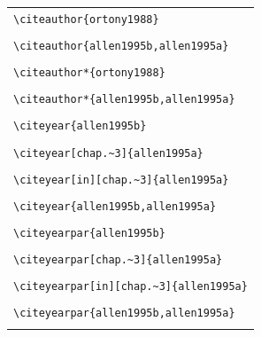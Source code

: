 ﻿\documentclass{article}
\begin{document}
\begin{center}
\begin{tabular}{l}
%
\verb#\citeauthor{ortony1988}# \\
 \citeauthor{ortony1988} \\\hline
\verb#\citeauthor{allen1995b,allen1995a}# \\
 \citeauthor{allen1995b,allen1995a} \\\hline
\verb#\citeauthor*{ortony1988}# \\
 \citeauthor*{ortony1988} \\\hline
\verb#\citeauthor*{allen1995b,allen1995a}# \\
 \citeauthor*{allen1995b,allen1995a} \\\hline\hline
%
\verb#\citeyear{allen1995b}# \\
 \citeyear{allen1995b} \\\hline
\verb#\citeyear[chap.~3]{allen1995a}# \\
 \citeyear[chap.~3]{allen1995a} \\\hline
\verb#\citeyear[in][chap.~3]{allen1995a}# \\
 \citeyear[in][chap.~3]{allen1995a} \\\hline
\verb#\citeyear{allen1995b,allen1995a}# \\
 \citeyear{allen1995b,allen1995a} \\\hline\hline
%
\verb#\citeyearpar{allen1995b}# \\
 \citeyearpar{allen1995b} \\\hline
\verb#\citeyearpar[chap.~3]{allen1995a}# \\
 \citeyearpar[chap.~3]{allen1995a} \\\hline
\verb#\citeyearpar[in][chap.~3]{allen1995a}# \\
 \citeyearpar[in][chap.~3]{allen1995a} \\\hline
\verb#\citeyearpar{allen1995b,allen1995a}# \\
 \citeyearpar{allen1995b,allen1995a} \\
\hline\hline
\end{tabular}
\end{center}
\end{document}
